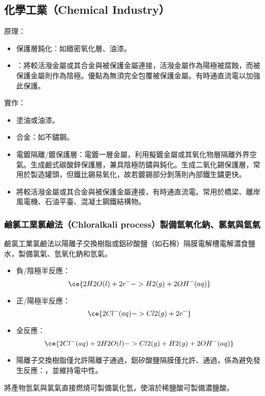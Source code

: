 \documentclass[a4paper,12pt]{report}
\begin{document}
\begin{itemize}
\begin{itemize}
\section{化學工業（Chemical Industry）}
原理：
\begin{itemize}
\item 保護層鈍化：如緻密氧化層、油漆。
\item {}：將較活潑金屬或其合金與被保護金屬連接，活潑金屬作為陽極被腐蝕，而被保護金屬則作為陰極。優點為無須完全包覆被保護金屬。有時通直流電以加強此保護。
\end{itemize}
實作：
\begin{itemize}
\item 塗油或油漆。
\item 合金：如不鏽鋼。
\item 電鍍隔離/鍍保護層：電鍍一層金屬，利用擬鍍金屬或其氧化物層隔離外界空氣。生成鹼式碳酸鋅保護層，兼具陰極防鏽與鈍化。生成二氧化錫保護層，常用於製造罐頭，但鐵比錫易氧化，故若鍍錫部分剝落則內部鐵生鏽更快。
\item 將較活潑金屬或其合金與被保護金屬連接，有時通直流電。常用於橋梁、離岸風電機、石油平臺、混凝土鋼鐵結構物。
\end{itemize}
\subsubsection{鹼氯工業氯鹼法（Chloralkali process）製備氫氧化鈉、氯氣與氫氣}
鹼氯工業氯鹼法以陽離子交換樹脂或鋁矽酸鹽（如石棉）隔膜電解槽電解濃食鹽水，製備氯氣、氫氧化鈉和氫氣。
\begin{itemize}
\item 負/陰極半反應：
\[\ce{2H2O(l) + 2e^- -> H2(g) + 2OH^-(aq)}\]
\item 正/陽極半反應：
\[\ce{2Cl^-(aq) -> Cl2(g) + 2e^-}\]
\item 全反應：
\[\ce{2Cl^-(aq) + 2H2O(l) -> Cl2(g) + H2(g) + 2OH^-(aq)}\]
\item 陽離子交換樹脂僅允許陽離子通過，鋁矽酸鹽隔膜僅允許、通過，係為避免發生反應：，並維持電中性。
\end{itemize}
將產物氫氣與氯氣直接燃燒可製備氯化氫，使溶於稀鹽酸可製備濃鹽酸。

\end{itemize}
\end{itemize}
\end{document}
